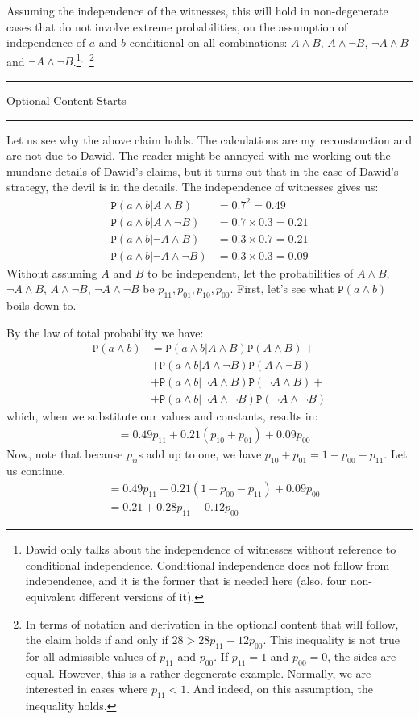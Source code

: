 \documentclass{ifcolog}
\newcommand{\intermezzoa}{
	\begin{minipage}[c]{13cm}
	\begin{center}\rule{10cm}{0.4pt}



	\tiny{\sc Optional Content Starts}
	
	\vspace{-1mm}
	
	\rule{10cm}{0.4pt}\end{center}
	\end{minipage}\nopagebreak 
	}
\newcommand{\pr}[1]{\mbox{$\mathtt{P}(#1)$}}
\newcommand{\n}{\neg}
\newcommand{\et}{\wedge}
\begin{document}
Assuming the  independence of the witnesses, this will hold  in non-degenerate cases that do not  involve extreme probabilities, on the assumption of independence of $a$ and $b$ conditional on all combinations: $A\et B$, $A\et \n B$, $\n A \et B$ and $\n A \et \n B$.\footnote{Dawid only talks about the independence of witnesses without reference to  conditional independence. Conditional independence does not follow from independence, and it is the former that is needed here (also, four non-equivalent different versions of it).}$^,$~\footnote{In terms of notation and derivation in the optional content that will follow, the claim holds  if and only if $28 > 28 p_{11}-12p_{00}$.  This inequality is not  true for all admissible values of $p_{11}$ and $p_{00}$. If $p_{11}=1$ and $p_{00}=0$, the sides are equal. However, this is a rather degenerate example. Normally, we are  interested in cases where $p_{11}< 1$. And indeed, on this assumption, the inequality holds.}




\intermezzoa

Let us see why the above claim holds. The calculations are my reconstruction and are not due to Dawid. The reader might be annoyed with me working out the mundane details of Dawid's claims, but it turns out that in the case of Dawid's strategy, the devil is in the details. The independence of witnesses gives us:
\begin{align*}
 \pr{a \et b \vert A\et B}& =0.7^2=0.49\\
 \pr{a \et b \vert A\et \n B}& =  0.7\times 0.3=0.21\\
 \pr{a \et b \vert \n A\et B}& =  0.3\times 0.7=0.21\\
 \pr{a \et b \vert \n A\et \n B}& =  0.3\times 0.3=0.09
 \end{align*}
  Without assuming $A$ and $B$ to be independent, let the probabilities of $A\et B$, $\n A\et B$, $A\et \n B$, $\n A\et \n B$ be $p_{11}, p_{01}, p_{10}, p_{00}$. First, let's see what $\pr{a\et b}$ boils down to.

By the law of total probability we have:
 \begin{align}\label{eq:total_lower}
 \pr{a\et b} & = 
                     \pr{a\et b \vert A \et B}\pr{A\et B} + \\ &  \nonumber
                     +\pr{a\et b \vert A \et \n B}\pr{A\et \n B} \\ &  \nonumber
 + \pr{a\et b \vert \n A \et B}\pr{\n A\et B} + \\ & \nonumber
                     + \pr{a\et b \vert \n A \et \n B}\pr{\n A\et \n B}
 \end{align}
 \noindent which, when we substitute our values and constants, results in:
 \begin{align*}
                     & = 0.49p_{11}+0.21(p_{10}+p_{01})+0.09p_{00}
 \end{align*}
 Now, note that because $p_{ii}$s add up to one, we have $p_{10}+p_{01}=1-p_{00}-p_{11}$. Let us continue.
 \begin{align*}
    & = 0.49p_{11}+0.21(1-p_{00}-p_{11})+0.09p_{00} \\
                     & = 0.21+0.28p_{11}-0.12p_{00}
 \end{align*}
 
\end{document}
